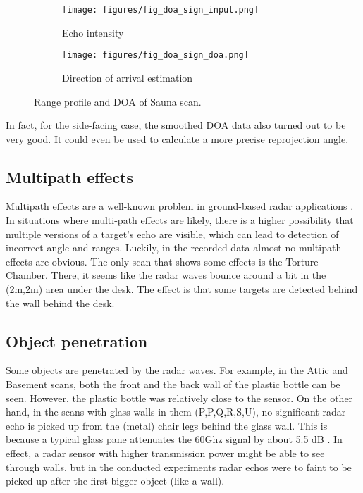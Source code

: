 \begin{figure}[htbp]
    \centering
    \begin{subfigure}[b]{0.45\textwidth}
        \texttt{[image: figures/fig\_doa\_sign\_input.png]}
        \caption{\label{fig:sauna_input}Echo intensity}
    \end{subfigure}
    \hfill
    \begin{subfigure}[b]{0.45\textwidth}
        \texttt{[image: figures/fig\_doa\_sign\_doa.png]}
        \caption{\label{fig:sauna_doa}Direction of arrival estimation}
    \end{subfigure}
    \caption{Range profile and DOA of Sauna scan.}
    \label{fig:sauna}
\end{figure}

In fact, for the side-facing case, the smoothed DOA data also turned out
to be very good. It could even be used to calculate a more precise
reprojection angle.

\subsection{Multipath effects}\label{multipath-effects}

Multipath effects are a well-known problem in ground-based radar
applications \cite{Adams2012}. In situations where multi-path effects
are likely, there is a higher possibility that multiple versions of a
target's echo are visible, which can lead to detection of incorrect
angle and ranges. Luckily, in the recorded data almost no multipath
effects are obvious. The only scan that shows some effects is the
Torture Chamber. There, it seems like the radar waves bounce around a
bit in the (2m,2m) area under the desk. The effect is that some targets
are detected behind the wall behind the desk.



\subsection{Object penetration}\label{object-penetration}

Some objects are penetrated by the radar waves. For example, in the
Attic and Basement scans, both the front and the back wall of the
plastic bottle can be seen. However, the plastic bottle was relatively
close to the sensor. On the other hand, in the scans with glass walls in
them (P,P,Q,R,S,U), no significant radar echo is picked up from the
(metal) chair legs behind the glass wall. This is because a typical
glass pane attenuates the 60Ghz signal by about 5.5 dB \cite{Lu2014}. In
effect, a radar sensor with higher transmission power might be able to
see through walls, but in the conducted experiments radar echos were to
faint to be picked up after the first bigger object (like a wall).

